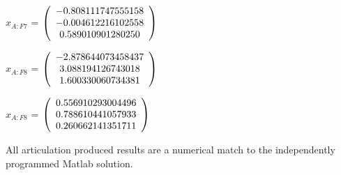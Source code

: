 \begin{description}
$\hat{x}_{A:F7}$  = $\left( \begin{array} {ccc} -0.808111747555158 \\ -0.004612216102558 \\ 0.589010901280250
\end{array} \right)\\ \\$

$x_{A:F8}$  = $\left( \begin{array} {ccc} -2.878644073458437 \\ 3.088194126743018 \\ 1.600330060734381
\end{array} \right)\\ \\$

$\hat{x}_{A:F8}$  = $\left( \begin{array} {ccc} 0.556910293004496 \\ 0.788610441057933 \\ 0.260662141351711
\end{array} \right)\\ \\$

All \ModelDesc articulation produced results are a numerical match to the
independently programmed Matlab solution.


\end{description}

\label{test:art_test_4}

